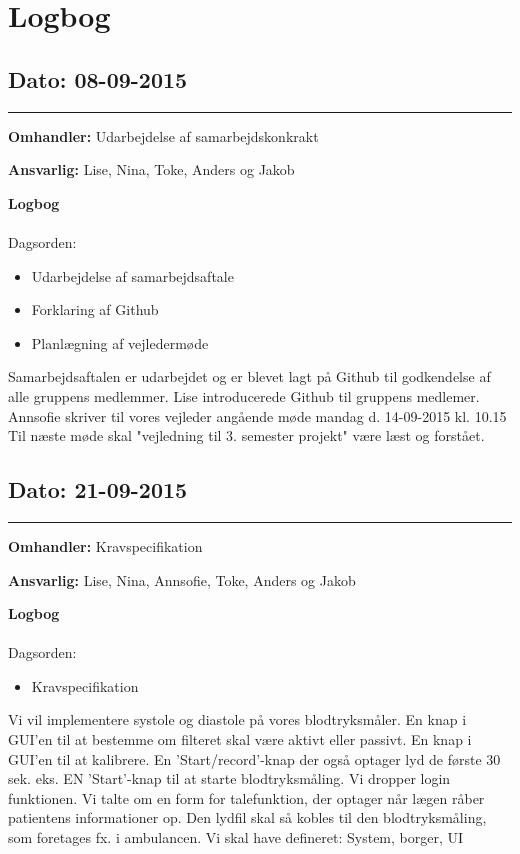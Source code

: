 \chapter{Logbog}

\section{Dato: 08-09-2015 }
\hrule

\textbf{Omhandler:} Udarbejdelse af samarbejdskonkrakt 

\textbf{Ansvarlig:} Lise, Nina, Toke, Anders og Jakob

\textbf{Logbog}
\\
\\
Dagsorden:
\begin{itemize}
	\item Udarbejdelse af samarbejdsaftale
	\item Forklaring af Github
	\item Planlægning af vejledermøde
\end{itemize}

Samarbejdsaftalen er udarbejdet og er blevet lagt på Github til godkendelse af alle gruppens medlemmer.\newline 
Lise introducerede Github til gruppens medlemer.\newline 
Annsofie skriver til vores vejleder angående møde mandag d. 14-09-2015 kl. 10.15\newline 
Til næste møde skal "vejledning til 3. semester projekt" være læst og forstået.\newline





\section{Dato: 21-09-2015 }
\hrule

\textbf{Omhandler:} Kravspecifikation

\textbf{Ansvarlig:} Lise, Nina, Annsofie, Toke, Anders og Jakob

\textbf{Logbog}
\\
\\
Dagsorden:
\begin{itemize}
	\item Kravspecifikation
\end{itemize}

Vi vil implementere systole og diastole på vores blodtryksmåler.
En knap i GUI'en til at bestemme om filteret skal være aktivt eller passivt.
En knap i GUI'en til at kalibrere.
En 'Start/record'-knap der også optager lyd de første 30 sek. eks.
EN 'Start'-knap til at starte blodtryksmåling.
Vi dropper login funktionen.
Vi talte om en form for talefunktion, der optager når lægen råber patientens informationer op. Den lydfil skal så kobles til den blodtryksmåling, som foretages fx. i ambulancen. 
Vi skal have defineret: System, borger, UI


